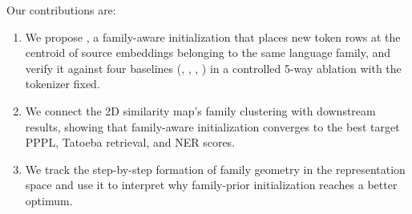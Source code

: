 Our contributions are:
\begin{enumerate}
  \item We propose \famm, a family-aware initialization that places new token rows
        at the centroid of source embeddings belonging to the same language family,
        and verify it against four baselines (\rand, \meanm, \fvt, \wfvt) in a
        controlled 5-way ablation with the tokenizer fixed.
  \item We connect the 2D similarity map's family clustering with downstream results,
        showing that family-aware initialization converges to the best target PPPL,
        Tatoeba retrieval, and NER scores.
  \item We track the step-by-step formation of family geometry in the representation
        space and use it to interpret why family-prior initialization reaches a better
        optimum.
\end{enumerate}
